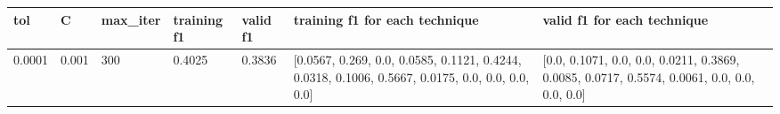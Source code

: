 \documentclass{article}%
\begin{document}
\begin{longtable}{l l l l l l l}%
\hline%
tol&C&max\_iter&training f1&valid f1&training f1 for each technique&valid f1 for each technique\\%
\hline%
\endhead%
\hline%
0.0001&0.001&300&0.4025&0.3836&{[}0.0567, 0.269, 0.0, 0.0585, 0.1121, 0.4244, 0.0318, 0.1006, 0.5667, 0.0175, 0.0, 0.0, 0.0, 0.0{]}&{[}0.0, 0.1071, 0.0, 0.0, 0.0211, 0.3869, 0.0085, 0.0717, 0.5574, 0.0061, 0.0, 0.0, 0.0, 0.0{]}\\%
\hline%
\end{longtable}%
\end{document}
